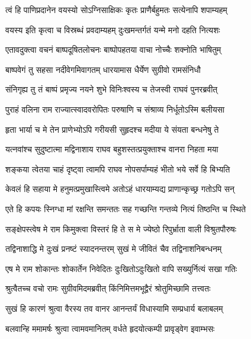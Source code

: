\twolineshloka
{त्वं हि पाणिप्रदानेन वयस्यो सोऽग्निसाक्षिकः}
{कृतः प्राणैर्बहुमतः सत्येनापि शपाम्यहम्} %

\twolineshloka
{वयस्य इति कृत्वा च विस्रब्धं प्रवदाम्यहम्}
{दुःखमन्तर्गतं यन्मे मनो दहति नित्यशः} %

\twolineshloka
{एतावदुक्त्वा वचनं बाष्पदूषितलोचनः}
{बाष्पोपहतया वाचा नोच्चैः शक्नोति भाषितुम्} %

\twolineshloka
{बाष्पवेगं तु सहसा नदीवेगमिवागतम्}
{धारयामास धैर्येण सुग्रीवो रामसंनिधौ} %

\twolineshloka
{संनिगृह्य तु तं बाष्पं प्रमृज्य नयने शुभे}
{विनिःश्वस्य च तेजस्वी राघवं पुनरब्रवीत्} %

\twolineshloka
{पुराहं वलिना राम राज्यात्स्वादवरोपितः}
{परुषाणि च संश्राव्य निर्धूतोऽस्मि बलीयसा} %

\twolineshloka
{हृता भार्या च मे तेन प्राणेभ्योऽपि गरीयसी}
{सुहृदश्च मदीया ये संयता बन्धनेषु ते} %

\twolineshloka
{यत्नवांश्च सुदुष्टात्मा मद्विनाशाय राघव}
{बहुशस्तत्प्रयुक्ताश्च वानरा निहता मया} %

\twolineshloka
{शङ्कया त्वेतया चाहं दृष्ट्वा त्वामपि राघव}
{नोपसर्पाम्यहं भीतो भये सर्वे हि बिभ्यति} %

\twolineshloka
{केवलं हि सहाया मे हनुमत्प्रमुखास्त्विमे}
{अतोऽहं धारयाम्यद्य प्राणान्कृच्छ्र गतोऽपि सन्} %

\twolineshloka
{एते हि कपयः स्निग्धा मां रक्षन्ति समन्ततः}
{सह गच्छन्ति गन्तव्ये नित्यं तिष्ठन्ति च स्थिते} %

\twolineshloka
{सङ्क्षेपस्त्वेष मे राम किमुक्त्वा विस्तरं हि ते}
{स मे ज्येष्ठो रिपुर्भ्राता वाली विश्रुतपौरुषः} %

\twolineshloka
{तद्विनाशाद्धि मे दुःखं प्रनष्टं स्यादनन्तरम्}
{सुखं मे जीवितं चैव तद्विनाशनिबन्धनम्} %

\twolineshloka
{एष मे राम शोकान्तः शोकार्तेन निवेदितः}
{दुःखितोऽदुःखितो वापि सख्युर्नित्यं सखा गतिः} %

\twolineshloka
{श्रुत्वैतच्च वचो रामः सुग्रीवमिदमब्रवीत्}
{किंनिमित्तमभूद्वैरं श्रोतुमिच्छामि तत्त्वतः} %

\twolineshloka
{सुखं हि कारणं श्रुत्वा वैरस्य तव वानर}
{आनन्तर्यं विधास्यामि सम्प्रधार्य बलाबलम्} %

\twolineshloka
{बलवान्हि ममामर्षः श्रुत्वा त्वामवमानितम्}
{वर्धते हृदयोत्कम्पी प्रावृड्वेग इवाम्भसः} %

